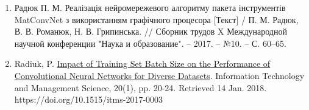 \documentclass[10pt,letterpaper]{article}
\begin{document}
\begin{enumerate}
	\parskip=0.1em
	
	\item Радюк П. М. Реалізація нейромережевого алгоритму пакета інструментів MatConvNet з використанням графічного процесора [Текст] / П. М. Радюк, В. В. Романюк, Н. В. Грипинська. // Сборник трудов X Международной научной конференции "Наука и образование". – 2017. – №10. – С. 60–65.
	
	\item Radiuk, P. \href{https://doi.org/10.1515/itms-2017-0003}{Impact of Training Set Batch Size on the Performance of Convolutional Neural Networks for Diverse Datasets}. Information Technology and Management Science, 20(1), pp. 20-24. Retrieved 14 Jan. 2018. https://doi.org/10.1515/itms-2017-0003

\end{enumerate}
\end{document}
